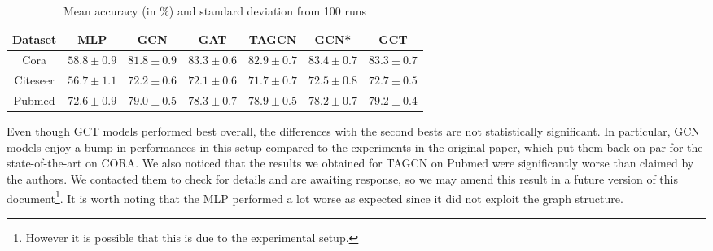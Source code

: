 \begin{table}[H]
\begin{center}
  \bgroup
  \def\arraystretch{1.5}%
  \begin{tabular}{|c|c|c|c|c|c|c|}
    \hline
    Dataset & MLP & GCN & GAT & TAGCN & GCN* & GCT\\
    \hline
    \hline
    Cora & $58.8 \pm 0.9$ & $81.8 \pm 0.9$ & $83.3 \pm 0.6$ & $82.9 \pm 0.7$ & $\mathbf{83.4} \pm 0.7$ & $83.3 \pm 0.7$\\
    \hline
    Citeseer & $56.7 \pm 1.1$ & $72.2 \pm 0.6$ & $72.1 \pm 0.6$ & $71.7 \pm 0.7$ & $72.5 \pm 0.8$ & $\mathbf{72.7} \pm 0.5$\\
    \hline
    Pubmed & $72.6 \pm 0.9$ & $79.0 \pm 0.5$ & $78.3 \pm 0.7$ & $78.9 \pm 0.5$ & $78.2 \pm 0.7$ & $\mathbf{79.2} \pm 0.4$\\
    \hline
  \end{tabular}
  \egroup
\end{center}
\caption{Mean accuracy (in \%) and standard deviation from 100 runs}
\label{tab:lss}
\end{table}

Even though GCT models performed best overall, the differences with the second bests are not statistically significant. In particular, GCN models enjoy a bump in performances in this setup compared to the experiments in the original paper, which put them back on par for the state-of-the-art on CORA. We also noticed that the results we obtained for TAGCN on Pubmed were significantly worse than claimed by the authors. We contacted them to check for details and are awaiting response, so we may amend this result in a future version of this document\footnote{However it is possible that this is due to the experimental setup.}. It is worth noting that the MLP performed a lot worse as expected since it did not exploit the graph structure.